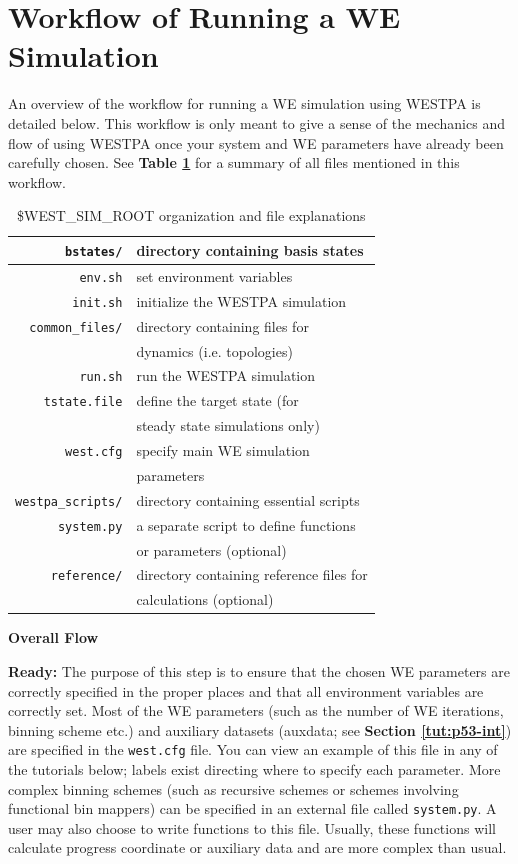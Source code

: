 \section{Workflow of Running a WE Simulation}

An overview of the workflow for running a WE simulation using WESTPA is detailed below. 
This workflow is only meant to give a sense of the mechanics and flow of using WESTPA once your system and WE parameters have already been carefully chosen. See \textbf{Table \ref{intro:table2}} for a summary of all files mentioned in this workflow.

\begin{table}
\caption{\$WEST\_SIM\_ROOT organization and file explanations}
\label{intro:table2}
\centering
\begin{tabular}{| r | l |}
\hline
\verb|bstates/| & directory containing basis states \\
\hline
\verb|env.sh| & set environment variables \\
\hline
\verb|init.sh| & initialize the WESTPA simulation \\
\hline
\verb|common_files/| & directory containing files for \\
{} & dynamics (i.e. topologies) \\
\hline
\verb|run.sh| & run the WESTPA simulation \\
\hline
\verb|tstate.file| & define the target state (for \\
{} & steady state simulations only) \\
\hline
\verb|west.cfg| & specify main WE simulation \\
{} & parameters \\
\hline
\verb|westpa_scripts/| & directory containing essential scripts \\
\hline
\verb|system.py| & a separate script to define functions \\
{} & or parameters (optional) \\
\hline
\verb|reference/| & directory containing reference files for \\
{} & calculations (optional) \\
\hline
\end{tabular}
\end{table}

\pagebreak
\noindent\textbf{Overall Flow}

\textbf{Ready:} The purpose of this step is to ensure that the chosen WE parameters are correctly specified in the proper places and that all environment variables are correctly set. 
Most of the WE parameters (such as the number of WE iterations, binning scheme etc.) and auxiliary datasets (auxdata; see \textbf{Section \ref{tut:p53-int}}) are specified in the \verb|west.cfg| file. 
You can view an example of this file in any of the tutorials below; labels exist directing where to specify each parameter. 
More complex binning schemes (such as recursive schemes or schemes involving functional bin mappers) can be specified in an external file called \verb|system.py|. 
A user may also choose to write functions to this file. 
Usually, these functions will calculate progress coordinate or auxiliary data and are more complex than usual.

